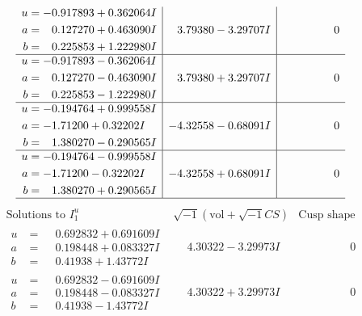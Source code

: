 \documentclass[1p]{elsarticle_modified}
\theoremstyle{definition}
\newcommand{\I}{\sqrt{-1}}
\begin{document}
$$\begin{array}{c|c|c}
\begin{aligned}
u &= -0.917893 + 0.362064 I \\
a &= \phantom{-}0.127270 + 0.463090 I \\
b &= \phantom{-}0.225853 + 1.222980 I\end{aligned}
 & \phantom{-}3.79380 - 3.29707 I & \phantom{-0.000000 } 0 \\ \hline\begin{aligned}
u &= -0.917893 - 0.362064 I \\
a &= \phantom{-}0.127270 - 0.463090 I \\
b &= \phantom{-}0.225853 - 1.222980 I\end{aligned}
 & \phantom{-}3.79380 + 3.29707 I & \phantom{-0.000000 } 0 \\ \hline\begin{aligned}
u &= -0.194764 + 0.999558 I \\
a &= -1.71200 + 0.32202 I \\
b &= \phantom{-}1.380270 - 0.290565 I\end{aligned}
 & -4.32558 - 0.68091 I & \phantom{-0.000000 } 0 \\ \hline\begin{aligned}
u &= -0.194764 - 0.999558 I \\
a &= -1.71200 - 0.32202 I \\
b &= \phantom{-}1.380270 + 0.290565 I\end{aligned}
 & -4.32558 + 0.68091 I & \phantom{-0.000000 } 0\\
 \hline 
 \end{array}$$\newpage$$\begin{array}{c|c|c}  
\text{Solutions to }I^u_{1}& \I (\text{vol} + \sqrt{-1}CS) & \text{Cusp shape}\\
 \hline 
\begin{aligned}
u &= \phantom{-}0.692832 + 0.691609 I \\
a &= \phantom{-}0.198448 + 0.083327 I \\
b &= \phantom{-}0.41938 + 1.43772 I\end{aligned}
 & \phantom{-}4.30322 - 3.29973 I & \phantom{-0.000000 } 0 \\ \hline\begin{aligned}
u &= \phantom{-}0.692832 - 0.691609 I \\
a &= \phantom{-}0.198448 - 0.083327 I \\
b &= \phantom{-}0.41938 - 1.43772 I\end{aligned}
 & \phantom{-}4.30322 + 3.29973 I & \phantom{-0.000000 } 0 \\ \hline\begin{aligned}

\end{aligned}
\end{array}$$
\end{document}
